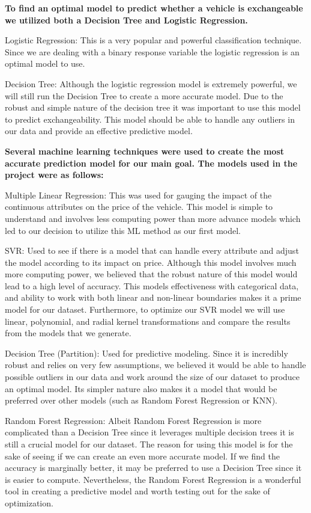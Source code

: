 \documentclass[
]{article}
\begin{document}
\textbf{To find an optimal model to predict whether a vehicle is
exchangeable we utilized both a Decision Tree and Logistic Regression.}

Logistic Regression: This is a very popular and powerful classification
technique. Since we are dealing with a binary response variable the
logistic regression is an optimal model to use.

Decision Tree: Although the logistic regression model is extremely
powerful, we will still run the Decision Tree to create a more accurate
model. Due to the robust and simple nature of the decision tree it was
important to use this model to predict exchangeability. This model
should be able to handle any outliers in our data and provide an
effective predictive model.

\textbf{Several machine learning techniques were used to create the most
accurate prediction model for our main goal. The models used in the
project were as follows:}

Multiple Linear Regression: This was used for gauging the impact of the
continuous attributes on the price of the vehicle. This model is simple
to understand and involves less computing power than more advance models
which led to our decision to utilize this ML method as our first model.

SVR: Used to see if there is a model that can handle every attribute and
adjust the model according to its impact on price. Although this model
involves much more computing power, we believed that the robust nature
of this model would lead to a high level of accuracy. This models
effectiveness with categorical data, and ability to work with both
linear and non-linear boundaries makes it a prime model for our dataset.
Furthermore, to optimize our SVR model we will use linear, polynomial,
and radial kernel transformations and compare the results from the
models that we generate.

Decision Tree (Partition): Used for predictive modeling. Since it is
incredibly robust and relies on very few assumptions, we believed it
would be able to handle possible outliers in our data and work around
the size of our dataset to produce an optimal model. Its simpler nature
also makes it a model that would be preferred over other models (such as
Random Forest Regression or KNN).

Random Forest Regression: Albeit Random Forest Regression is more
complicated than a Decision Tree since it leverages multiple decision
trees it is still a crucial model for our dataset. The reason for using
this model is for the sake of seeing if we can create an even more
accurate model. If we find the accuracy is marginally better, it may be
preferred to use a Decision Tree since it is easier to compute.
Nevertheless, the Random Forest Regression is a wonderful tool in
creating a predictive model and worth testing out for the sake of
optimization.
\end{document}
